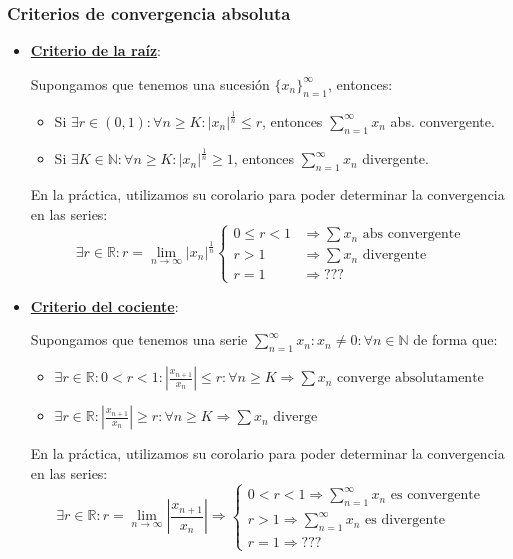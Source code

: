 \documentclass[10pt,a4paper,openright]{book}
\begin{document}
\subsubsection*{Criterios de convergencia absoluta}
\begin{itemize}
\item \underline{\textbf{Criterio de la raíz}}:

	Supongamos que tenemos una sucesión $\{x_n\}_{n=1}^\infty$, entonces:
	\begin{itemize}
	\item Si $\exists r\in (0,1): \forall n\geq K: |x_n|^\frac{1}{n}\leq r$, entonces $\sum_{n=1}^{\infty} x_n$ abs. convergente.
	\item Si $\exists K \in \mathbb N: \forall n\geq K: |x_n|^\frac{1}{n} \geq 1$, entonces $\sum_{n=1}^{\infty} x_n$ divergente.
	\end{itemize}
	En la práctica, utilizamos su corolario para poder determinar la convergencia en las series:
$$\exists r \in \mathbb R: r= \lim_{n \rightarrow \infty} |x_n|^{\frac{1}{n}} \begin{cases}
0 \leq r < 1 &\Rightarrow \sum x_n \mbox{ abs convergente} \\ r>1 &\Rightarrow \sum x_n\mbox{ divergente}\\ r=1 &\Rightarrow ???\end{cases}$$

	
\item \underline{\textbf{Criterio del cociente}}:
	
	Supongamos que tenemos una serie $\sum_{ n = 1}^\infty x_n: x_n \neq 0 : \forall n \in \mathbb N$ de forma que:
	\begin{itemize}
	\item $\exists r \in \mathbb{R}: 0 < r < 1 : \left|\frac{x_{n+1}}{x_n}\right| \leq r : \forall n \geq K \Rightarrow \sum x_n \mbox{ converge absolutamente }$
	\item $\exists r \in \mathbb{R} : \left|\frac{x_{n+1}}{x_n}\right| \geq r : \forall n \geq K \Rightarrow \sum x_n \mbox{ diverge } $
	\end{itemize}
	En la práctica, utilizamos su corolario para poder determinar la convergencia en las series:
	$$\exists r\in \mathbb R: r = \lim_{n \rightarrow \infty} \left|\frac{x_{n+1}}{x_n}\right|\Rightarrow \begin{cases} 0<r<1 \Rightarrow \sum_{n=1}^{\infty} x_n \mbox{ es convergente} \\ r>1 \Rightarrow  \sum_{n=1}^{\infty} x_n \mbox{ es divergente} \\ r = 1 \Rightarrow ??? \end{cases}	$$
\end{itemize}
\end{document}
